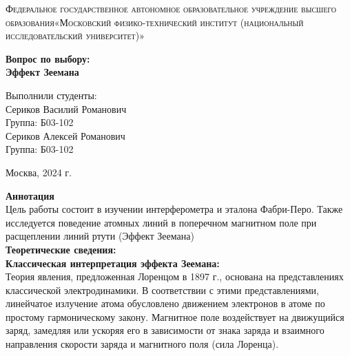 \documentclass[a4paper, 12pt]{article}%
\begin{document}
	\begin{titlepage}
		\begin{center}
			\textsc{Федеральное государственное автономное образовательное учреждение высшего образования«Московский физико-технический институт (национальный исследовательский университет)»\\[5mm]
			}
			
			\vfill
			
			\textbf{Вопрос по выбору: \\[3mm]
				Эффект Зеемана
				\\[50mm]
			}
			
		\end{center}
		
		\hfill
		\begin{minipage}{.5\textwidth}
			Выполнили студенты:\\[2mm]
			Сериков Василий Романович\\[2mm]
			Группа: Б03-102\\[5mm]
			Сериков Алексей Романович\\[2mm]
			Группа: Б03-102\\[5mm]
			
		\end{minipage}
		\vfill
		\begin{center}
			Москва, 2024 г.
		\end{center}
		
	\end{titlepage}
	
	\newpage
	\textbf{Аннотация}\\
	
	Цель работы состоит в изучении интерферометра и эталона Фабри-Перо. Также исследуется поведение атомных линий в поперечном магнитном поле при расщеплении линий ртути (Эффект Зеемана)\\
	
	
	\textbf{Теоретические сведения: }\\
	
	\textbf{Классическая интерпретация эффекта Зеемана: }\\
	
	Теория явления, предложенная Лоренцом в 1897 г., основана на представлениях классической электродинамики. В соответствии с этими представлениями, линейчатое излучение атома обусловлено движением электронов в атоме по простому гармоническому закону. Магнитное поле воздействует на движущийся заряд, замедляя или ускоряя его в зависимости от знака заряда и взаимного направления скорости заряда и магнитного поля (сила Лоренца).
	
\end{document}
